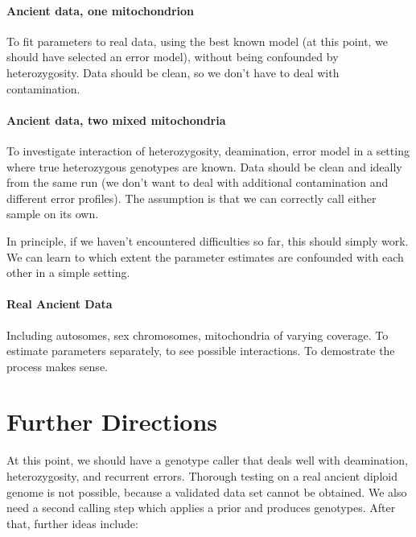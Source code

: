 \documentclass{article}
\begin{document}
\paragraph{Ancient data, one mitochondrion}

To fit parameters to real data, using the best known model (at this
point, we should have selected an error model), without being confounded
by heterozygosity.  Data should be clean, so we don't have to deal with
contamination.


\paragraph{Ancient data, two mixed mitochondria}

To investigate interaction of heterozygosity, deamination, error model
in a setting where true heterozygous genotypes are known.  Data should
be clean and ideally from the same run (we don't want to deal with
additional contamination and different error profiles).  The assumption
is that we can correctly call either sample on its own.

In principle, if we haven't encountered difficulties so far, this should
simply work.  We can learn to which extent the parameter estimates are
confounded with each other in a simple setting.

\paragraph{Real Ancient Data}

Including autosomes, sex chromosomes, mitochondria of
varying coverage.  To estimate parameters separately, to see possible
interactions.  To demostrate the process makes sense. 


\section{Further Directions}

At this point, we should have a genotype caller that deals well with
deamination, heterozygosity, and recurrent errors.  Thorough testing on
a real ancient diploid genome is not possible, because a validated data
set cannot be obtained.  We also need a second calling step which
applies a prior and produces genotypes.  After that, further ideas
include: 
\end{document}
